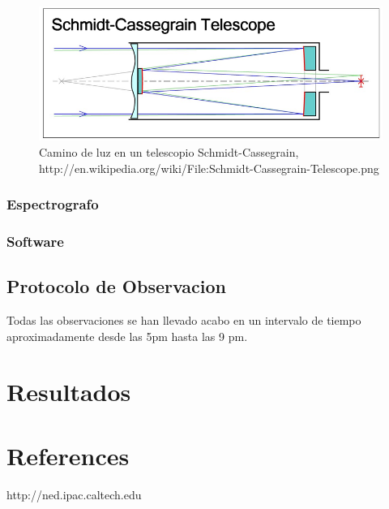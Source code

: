 \documentclass[Proceedings]{ascelike}
\begin{document}
\begin{figure}
\includegraphics[scale=0.4]{SCT2.jpg}
\caption{Camino de luz en un telescopio Schmidt-Cassegrain, http://en.wikipedia.org/wiki/File:Schmidt-Cassegrain-Telescope.png \label{la}}
\end{figure}

\subsubsection{Espectrografo}

\subsubsection{Software}

\subsection{Protocolo de Observacion}

Todas las observaciones se han llevado acabo en un intervalo de tiempo aproximadamente 
desde las 5pm hasta las 9 pm.

\section{Resultados}

\section{References}

http://ned.ipac.caltech.edu
\end{document}
